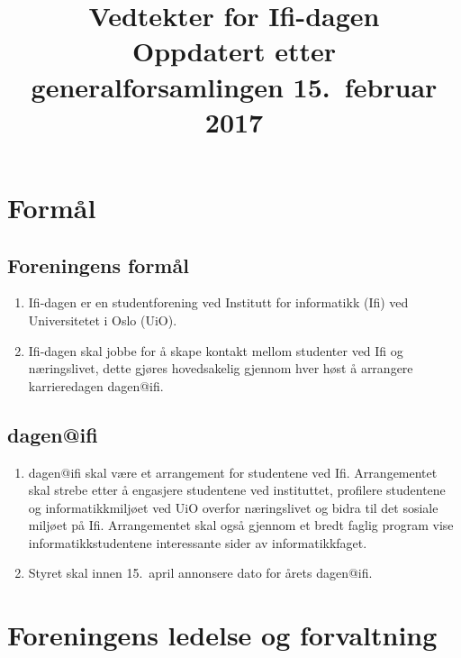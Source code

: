 \documentclass[norsk,a4paper]{article}
\title{\textbf{Vedtekter for Ifi-dagen} \\
{\large Oppdatert etter generalforsamlingen 15.\ februar 2017}}
\date{}
\begin{document}
\maketitle{}
\thispagestyle{fancy}

\section{Formål}
\subsection{Foreningens formål}
\begin{enumerate}
    \item{Ifi-dagen er en studentforening ved Institutt for informatikk (Ifi) ved Universitetet i Oslo (UiO).}
    \item{Ifi-dagen skal jobbe for å skape kontakt mellom studenter ved Ifi og næringslivet, dette gjøres hovedsakelig gjennom hver høst å arrangere karrieredagen dagen@ifi.}
\end{enumerate}
\subsection{dagen@ifi}
\begin{enumerate}
    \item{dagen@ifi skal være et arrangement for studentene ved Ifi. Arrangementet skal strebe etter å engasjere studentene ved instituttet, profilere studentene og informatikkmiljøet ved UiO overfor næringslivet og bidra til det sosiale miljøet på Ifi. Arrangementet skal også gjennom et bredt faglig program vise informatikkstudentene interessante sider av informatikkfaget.}
    \item{Styret skal innen 15.\ april annonsere dato for årets dagen@ifi.}
\end{enumerate}

\section{Foreningens ledelse og forvaltning}
\end{document}
